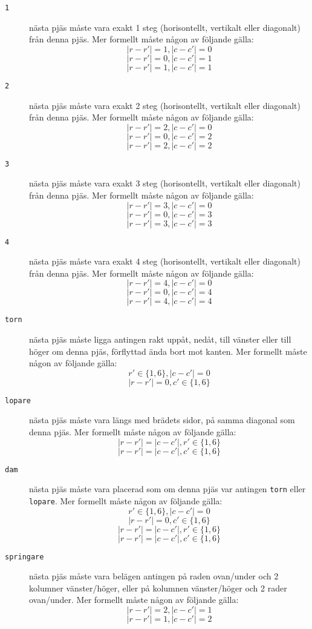 \begin{description}
  \item[\texttt{1}] nästa pjäs måste vara exakt 1 steg (horisontellt, vertikalt eller diagonalt) från denna pjäs.
    Mer formellt måste någon av följande gälla:
    $$|r - r'| = 1, |c - c'| = 0$$
    $$|r - r'| = 0, |c - c'| = 1$$
    $$|r - r'| = 1, |c - c'| = 1$$

  \item[\texttt{2}] nästa pjäs måste vara exakt 2 steg (horisontellt, vertikalt eller diagonalt) från denna pjäs.
    Mer formellt måste någon av följande gälla:
    $$|r - r'| = 2, |c - c'| = 0$$
    $$|r - r'| = 0, |c - c'| = 2$$
    $$|r - r'| = 2, |c - c'| = 2$$

  \item[\texttt{3}] nästa pjäs måste vara exakt 3 steg (horisontellt, vertikalt eller diagonalt) från denna pjäs.
    Mer formellt måste någon av följande gälla:
    $$|r - r'| = 3, |c - c'| = 0$$
    $$|r - r'| = 0, |c - c'| = 3$$
    $$|r - r'| = 3, |c - c'| = 3$$

  \item[\texttt{4}] nästa pjäs måste vara exakt 4 steg (horisontellt, vertikalt eller diagonalt) från denna pjäs.
    Mer formellt måste någon av följande gälla:
    $$|r - r'| = 4, |c - c'| = 0$$
    $$|r - r'| = 0, |c - c'| = 4$$
    $$|r - r'| = 4, |c - c'| = 4$$

  \item[\texttt{torn}] nästa pjäs måste ligga antingen rakt
    uppåt, nedåt, till vänster eller till höger om denna pjäs, förflyttad ända bort mot kanten.
    Mer formellt måste någon av följande gälla:
    $$r' \in \{1, 6\}, |c - c'| = 0$$
    $$|r - r'| = 0, c' \in \{1, 6\}$$

  \item[\texttt{lopare}] nästa pjäs måste vara längs med brädets sidor, på samma diagonal som denna pjäs.
    Mer formellt måste någon av följande gälla:
    $$|r - r'| = |c - c'|, r' \in \{1, 6\}$$
    $$|r - r'| = |c - c'|, c' \in \{1, 6\}$$

  \item[\texttt{dam}] nästa pjäs måste vara placerad som om denna pjäs var antingen \texttt{torn} eller \texttt{lopare}.
    Mer formellt måste någon av följande gälla:
    $$r' \in \{1, 6\}, |c - c'| = 0$$
    $$|r - r'| = 0, c' \in \{1, 6\}$$
    $$|r - r'| = |c - c'|, r' \in \{1, 6\}$$
    $$|r - r'| = |c - c'|, c' \in \{1, 6\}$$

  \item[\texttt{springare}] nästa pjäs måste vara belägen antingen på raden ovan/under och 2 kolumner vänster/höger, eller
    på kolumnen vänster/höger och 2 rader ovan/under.
    Mer formellt måste någon av följande gälla:
    $$|r - r'| = 2, |c - c'| = 1$$
    $$|r - r'| = 1, |c - c'| = 2$$
\end{description}

